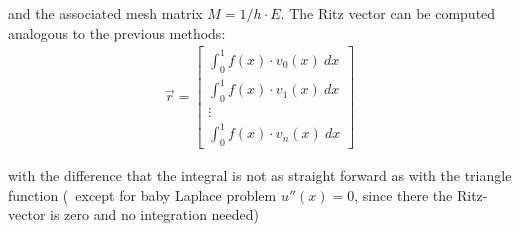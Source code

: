 and the associated mesh matrix $M = 1/h\cdot E$.
The Ritz vector can be computed analogous to the previous methods:
\begin{align*}
    \vec{r} = \begin{bmatrix}
        \int_0^1 f(x)\cdot v_0(x)\ dx \\
        \int_0^1 f(x)\cdot v_1(x)\ dx \\
        \vdots \\
        \int_0^1 f(x)\cdot v_n(x)\ dx
    \end{bmatrix}
\end{align*}

with the difference that the integral is not as straight forward as with the triangle function
({\color{blue}\faInfo}\ except for baby Laplace problem $u''(x) = 0$, since there the Ritz-vector is zero and no integration needed)

